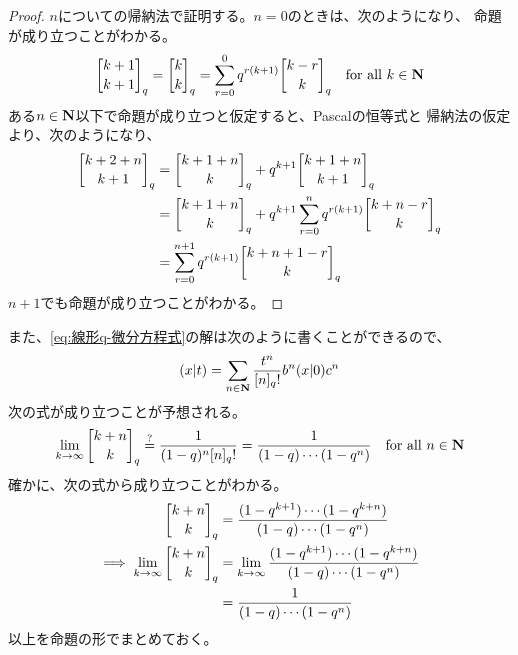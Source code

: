 {	\begin{proof} %
		$n$についての帰納法で証明する。$n=0$のときは、次のようになり、
		命題が成り立つことがわかる。
		\begin{equation*}\begin{split}
			\qbinom{k+1}{k+1}_q = \qbinom{k}{k}_q
			= \sum_{r=0}^0 q^{r(k+1)}\qbinom{k-r}{k}_q 
			\quad\text{for all } k\in\sizen
		\end{split}\end{equation*}
		ある$n\in\mathbf{N}$以下で命題が成り立つと仮定すると、Pascalの恒等式と
		帰納法の仮定より、次のようになり、
		\begin{equation*}\begin{split}
			\qbinom{k+2+n}{k+1}_q 
			&= \qbinom{k+1+n}{k}_q + q^{k+1}\qbinom{k+1+n}{k+1}_q \\
			&= \qbinom{k+1+n}{k}_q + q^{k+1}\sum_{r=0}^n q^{r(k+1)}
				\qbinom{k+n-r}{k}_q \\
			&= \sum_{r=0}^{n+1} q^{r(k+1)}\qbinom{k+n+1-r}{k}_q
		\end{split}\end{equation*}
		$n+1$でも命題が成り立つことがわかる。
	\end{proof} %
	また、\eqref{eq:線形q-微分方程式}の解は次のように書くことができるので、
	\begin{equation*}\begin{split}
		(x|t) = \sum_{n\in\mathbf{N}}\frac{t^n}{[n]_q!} b^n(x|0)c^n
	\end{split}\end{equation*}
	次の式が成り立つことが予想される。
	\begin{equation*}\begin{split}
		\lim_{k\to\infty} \qbinom{k+n}{k}_q
		\overset{?}{=} \frac{1}{(1-q)^n[n]_q!}
		= \frac{1}{(1-q)\cdots(1-q^n)}
		\quad\text{for all } n\in\sizen
	\end{split}\end{equation*}
	確かに、次の式から成り立つことがわかる。
	\begin{equation*}\begin{split}
		\qbinom{k+n}{k}_q &= \frac{(1-q^{k+1})\cdots(1-q^{k+n})}
			{(1-q)\cdots(1-q^n)} \\
		\implies \lim_{k\to\infty}\qbinom{k+n}{k}_q 
		&= \lim_{k\to\infty}\frac{(1-q^{k+1})\cdots(1-q^{k+n})}
			{(1-q)\cdots(1-q^n)} \\
		&= \frac{1}{(1-q)\cdots(1-q^n)} \\
	\end{split}\end{equation*}
	以上を命題の形でまとめておく。

}

